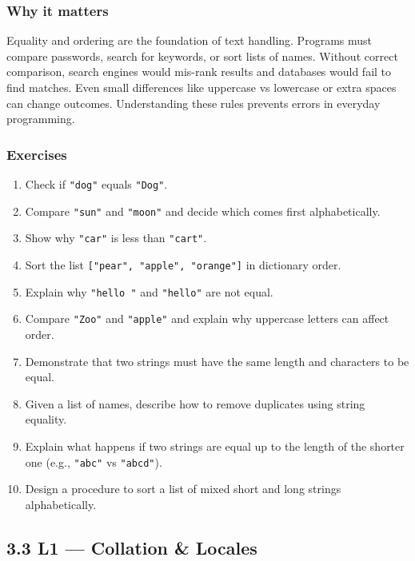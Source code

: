 \documentclass[
  letterpaper,
  DIV=11,
  numbers=noendperiod]{scrreprt}
\providecommand{\tightlist}{%
  \setlength{\itemsep}{0pt}\setlength{\parskip}{0pt}}
\begin{document}
\subsubsection{Why it matters}\label{why-it-matters-36}

Equality and ordering are the foundation of text handling. Programs must
compare passwords, search for keywords, or sort lists of names. Without
correct comparison, search engines would mis-rank results and databases
would fail to find matches. Even small differences like uppercase vs
lowercase or extra spaces can change outcomes. Understanding these rules
prevents errors in everyday programming.

\subsubsection{Exercises}\label{exercises-35}

\begin{enumerate}
\def\labelenumi{\arabic{enumi}.}
\tightlist
\item
  Check if \texttt{"dog"} equals \texttt{"Dog"}.
\item
  Compare \texttt{"sun"} and \texttt{"moon"} and decide which comes
  first alphabetically.
\item
  Show why \texttt{"car"} is less than \texttt{"cart"}.
\item
  Sort the list \texttt{{[}"pear",\ "apple",\ "orange"{]}} in dictionary
  order.
\item
  Explain why \texttt{"hello\ "} and \texttt{"hello"} are not equal.
\item
  Compare \texttt{"Zoo"} and \texttt{"apple"} and explain why uppercase
  letters can affect order.
\item
  Demonstrate that two strings must have the same length and characters
  to be equal.
\item
  Given a list of names, describe how to remove duplicates using string
  equality.
\item
  Explain what happens if two strings are equal up to the length of the
  shorter one (e.g., \texttt{"abc"} vs \texttt{"abcd"}).
\item
  Design a procedure to sort a list of mixed short and long strings
  alphabetically.
\end{enumerate}

\subsection{3.3 L1 --- Collation \& Locales}\label{l1-collation-locales}
\end{document}
